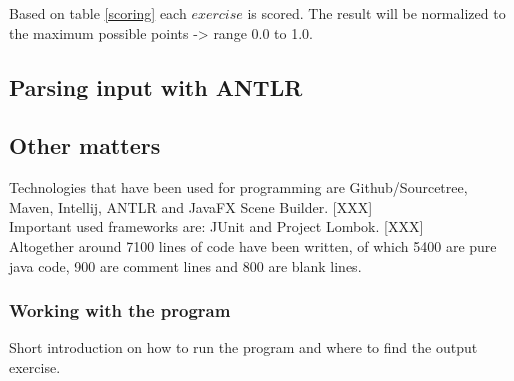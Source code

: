 \noindent Based on table \ref{scoring} each $exercise$ is scored.
The result will be normalized to the maximum possible points -> range 0.0 to 1.0. 

\pagebreak
\subsection{Parsing input with ANTLR}







\subsection{Other matters}

Technologies that have been used for programming are Github/Sourcetree, Maven, Intellij, ANTLR and JavaFX Scene Builder. [XXX] \\
Important used frameworks are: JUnit and Project Lombok. [XXX]\\
Altogether around 7100 lines of code have been written, of which 5400 are pure java code, 900 are comment lines and 800 are blank lines.\\

\subsubsection{Working with the program}
Short introduction on how to run the program and where to find the output exercise.
\pagebreak